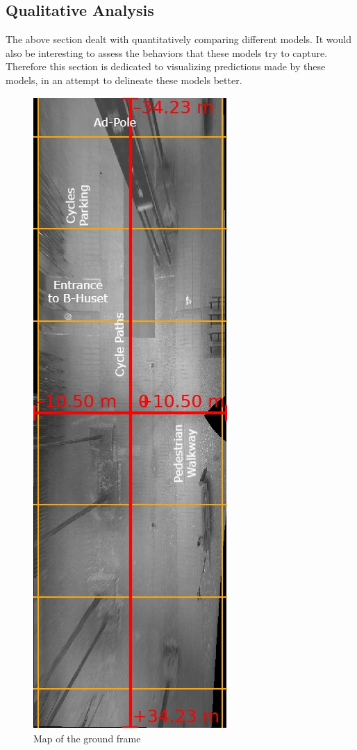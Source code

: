 \documentclass{article}
\begin{document}
\subsection{Qualitative Analysis}
The above section dealt with quantitatively comparing different models. It would also be interesting to assess the behaviors that these models try to capture. Therefore this section is dedicated to visualizing predictions made by these models, in an attempt to delineate these models better.

\begin{figure}[H]
\centering
\includegraphics[scale=0.3]{quali_results/ground.jpg}
\caption{Map of the ground frame}
\end{figure}
\end{document}
